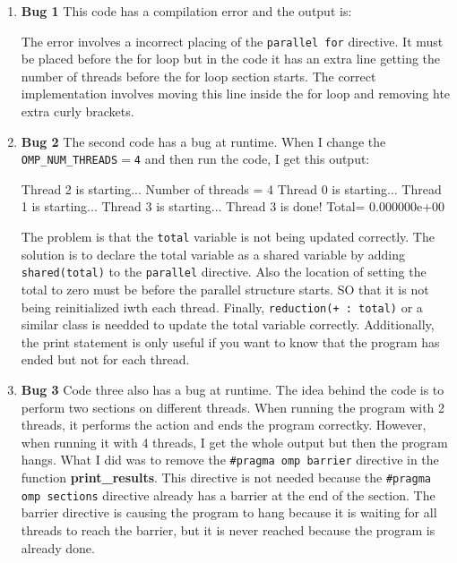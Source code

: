 \documentclass[unicode,11pt,a4paper,oneside,numbers=endperiod,openany]{scrartcl}
\begin{document}
\begin{enumerate}
  \item \textbf{Bug 1} This code has a compilation error and the output is:
  \begin{grayverbatim}
omp_bug1.c:25:3: error: statement after '#pragma omp parallel for' must be a for loop
  {
  ^
1 error generated.
  \end{grayverbatim}

The error involves a incorrect placing of the \texttt{parallel for} directive.
It must be placed before the for loop but in the code it has an extra line
getting the number of threads before the for loop section starts. The correct
implementation involves moving this line inside the for loop and removing hte
extra curly brackets.

  \item \textbf{Bug 2}
The second code has a bug at runtime. When I change the 
\texttt{OMP\_NUM\_THREADS$=$4} and then run the code, I get this output:
\begin{grayverbatim}
Thread 2 is starting...
Number of threads = 4
Thread 0 is starting...
Thread 1 is starting...
Thread 3 is starting...
Thread 3 is done! Total= 0.000000e+00
\end{grayverbatim}

  The problem is that the \texttt{total} variable is not being updated correctly.
  The solution is to declare the total variable as a shared variable by adding
  \texttt{shared(total)} to the \texttt{parallel} directive. Also the location of
  setting the total to zero must be before the parallel structure starts. SO that
  it is not being reinitialized iwth each thread. Finally,  \texttt{reduction(+ :
  total)} or a similar class is needded to update the total variable correctly.
  Additionally, the print
  statement is only useful if you want to know that the program has ended but not
  for each thread. 

  \item \textbf{Bug 3}
  Code three also has a bug at runtime. The idea behind the code is to perform two
  sections on different threads. When running the program with 2 threads, it
  performs the action and ends the program correctky. However, when running it
  with 4 threads, I get the whole output but then the program hangs.
  What I did was to remove the \texttt{\#pragma omp barrier} directive in the
  function \textbf{print\_results}. This directive is not needed because the
  \texttt{\#pragma omp sections} directive already has a barrier at the end of
  the section. The barrier directive is causing the program to hang because it
  is waiting for all threads to reach the barrier, but it is never
  reached because the program is already done.


\end{enumerate}
\end{document}
